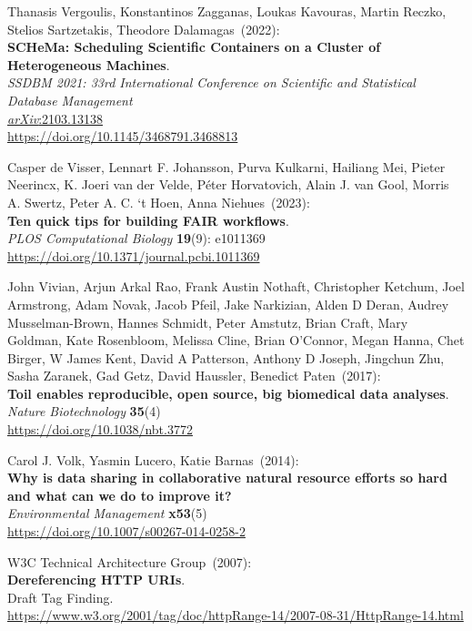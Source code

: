 \begin{thebibliography}{9}
Thanasis Vergoulis, Konstantinos Zagganas, Loukas Kavouras, Martin Reczko, Stelios Sartzetakis, Theodore Dalamagas~(2022): \\
\textbf{SCHeMa: Scheduling Scientific Containers on a Cluster of Heterogeneous Machines}.\\
\emph{SSDBM 2021: 33rd International Conference on Scientific and Statistical Database Management}\\
\href{https://doi.org/10.48550/arXiv.2103.13138}{\emph{arXiv}:2103.13138}\\
\url{https://doi.org/10.1145/3468791.3468813}

Casper de Visser, Lennart F. Johansson, Purva Kulkarni, Hailiang Mei, Pieter Neerincx, K. Joeri van der Velde, Péter Horvatovich, Alain J. van Gool, Morris A. Swertz, Peter A. C. ‘t Hoen, Anna Niehues~(2023):\\
\textbf{Ten quick tips for building FAIR workflows}.\\
\emph{PLOS Computational Biology} \textbf{19}(9): e1011369\\
\url{https://doi.org/10.1371/journal.pcbi.1011369}

John Vivian, Arjun Arkal Rao, Frank Austin Nothaft, Christopher Ketchum, Joel Armstrong, Adam Novak, Jacob Pfeil, Jake Narkizian, Alden D Deran, Audrey Musselman-Brown, Hannes Schmidt, Peter Amstutz, Brian Craft, Mary Goldman, Kate Rosenbloom, Melissa Cline, Brian O'Connor, Megan Hanna, Chet Birger, W James Kent, David A Patterson, Anthony D Joseph, Jingchun Zhu, Sasha Zaranek, Gad Getz, David Haussler, Benedict Paten~(2017): \\
\textbf{Toil enables reproducible, open source, big biomedical data analyses}.\\
\emph{Nature Biotechnology} \textbf{35}(4)\\
\url{https://doi.org/10.1038/nbt.3772}

Carol J. Volk, Yasmin Lucero, Katie Barnas~(2014): \\
\textbf{Why is data sharing in collaborative natural resource efforts so hard and what can we do to improve it?}\\
\emph{Environmental Management} \textbf{x53}(5) \\
\url{https://doi.org/10.1007/s00267-014-0258-2}

W3C Technical Architecture Group~(2007): \\
\textbf{Dereferencing HTTP URIs}.\\
Draft Tag Finding.\\
\url{https://www.w3.org/2001/tag/doc/httpRange-14/2007-08-31/HttpRange-14.html}


\end{thebibliography}
